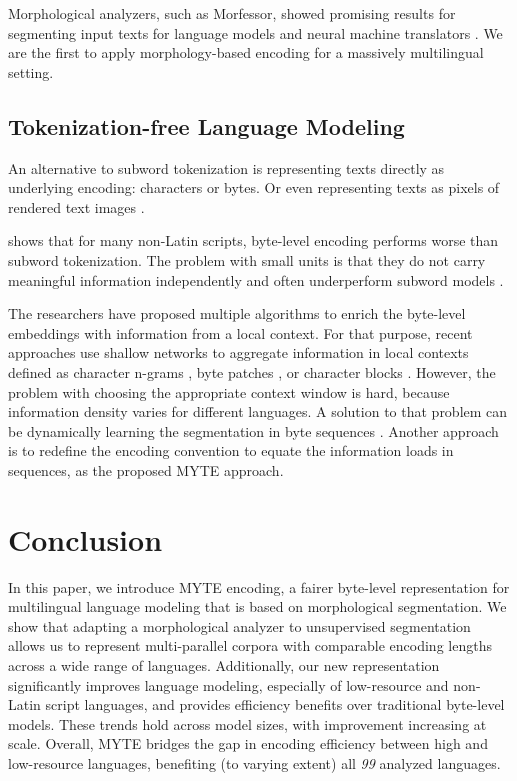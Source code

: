 Morphological analyzers, such as Morfessor, showed promising results for segmenting input texts for language models and neural machine translators \cite{Machcek2018MorphologicalAL,hou-etal-2023-effects}. We are the first to apply morphology-based encoding for a massively multilingual setting.

\subsection{Tokenization-free Language Modeling}

An alternative to subword tokenization is representing texts directly as underlying encoding: characters or bytes. Or even representing texts as pixels of rendered text images \cite{rust-etal-2023-pixel}.

\citet{xue_byt5_2022} shows that for many non-Latin scripts, byte-level encoding performs worse than subword tokenization. The problem with small units is that they do not carry meaningful information independently and often underperform subword models \cite{sun-etal-2023-multi,clark-etal-2022-canine}.

The researchers have proposed multiple algorithms to enrich the byte-level embeddings with information from a local context. For that purpose, recent approaches use shallow networks to aggregate information in local contexts defined as character n-grams \cite{clark-etal-2022-canine},  byte patches \cite{yu2023megabyte}, or character blocks \cite{tay2021charformer}. However, the problem with choosing the appropriate context window is hard, because information density varies for different languages. A solution to that problem can be dynamically learning the segmentation in byte sequences \cite{nawrot-etal-2023-efficient}. Another approach is to redefine the encoding convention to equate the information loads in sequences, as the proposed \textsc{MYTE} approach.

\section{Conclusion}

In this paper, we introduce \textsc{MYTE} encoding, a fairer byte-level representation for multilingual language modeling that is based on morphological segmentation. We show that adapting a morphological analyzer to unsupervised segmentation allows us to represent multi-parallel corpora with comparable encoding lengths across a wide range of languages. Additionally, our new representation significantly improves language modeling, especially of low-resource and non-Latin script languages, and provides efficiency benefits over traditional byte-level models. These trends hold across model sizes, with improvement increasing at scale. Overall, \textsc{MYTE} bridges the gap in encoding efficiency between high and low-resource languages, benefiting (to varying extent) all \emph{99} analyzed languages.


